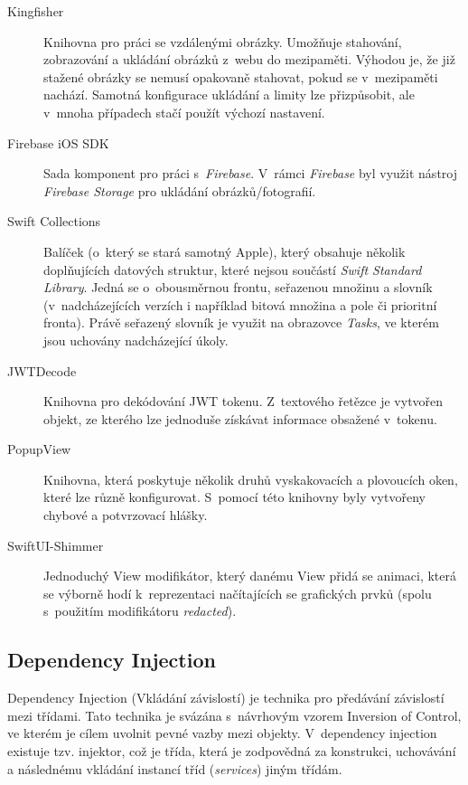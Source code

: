 \documentclass[thesis=M,czech]{FITthesis}[2019/12/23]
\begin{document}
\begin{description}
    \item[Kingfisher] Knihovna pro práci se vzdálenými obrázky. Umožňuje stahování, zobrazování a ukládání obrázků z~webu do mezipaměti. Výhodou je, že již stažené obrázky se nemusí opakovaně stahovat, pokud se v~mezipaměti nachází. Samotná konfigurace ukládání a limity lze přizpůsobit, ale v~mnoha případech stačí použít výchozí nastavení. \cite{kingfisher}
    \item[Firebase iOS SDK] Sada komponent pro práci s~\textit{Firebase}. V~rámci \textit{Firebase} byl využit nástroj \textit{Firebase Storage} pro ukládání obrázků/fotografií.
    \item[Swift Collections] Balíček (o~který se stará samotný Apple), který obsahuje několik doplňujících datových struktur, které nejsou součástí \textit{Swift Standard Library}. Jedná se o~obousměrnou frontu, seřazenou množinu a slovník (v~nadcházejících verzích i například bitová množina a pole či prioritní fronta). Právě seřazený slovník je využit na obrazovce \textit{Tasks}, ve kterém jsou uchovány nadcházející úkoly. \cite{swift-collections}
    \item[JWTDecode] Knihovna pro dekódování JWT tokenu. Z~textového řetězce je vytvořen objekt, ze kterého lze jednoduše získávat informace obsažené v~tokenu. \cite{jwtdecode}
    \item[PopupView] Knihovna, která poskytuje několik druhů vyskakovacích a plovoucích oken, které lze různě konfigurovat. S~pomocí této knihovny byly vytvořeny chybové a potvrzovací hlášky. \cite{popupview}
    \item[SwiftUI-Shimmer] Jednoduchý View modifikátor, který danému View přidá  se animaci, která se výborně hodí k~reprezentaci načítajících se grafických prvků (spolu s~použitím modifikátoru \textit{redacted}). \cite{swiftui-shimmer}
\end{description}

\subsection{Dependency Injection}
Dependency Injection (Vkládání závislostí) je technika pro předávání závislostí mezi třídami. Tato technika je svázána s~návrhovým vzorem Inversion of Control, ve kterém je cílem uvolnit pevné vazby mezi objekty. V~dependency injection existuje tzv. injektor, což je třída, která je zodpovědná za konstrukci, uchovávání a následnému vkládání instancí tříd (\textit{services}) jiným třídám.
\end{document}
